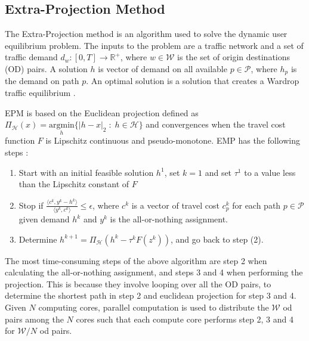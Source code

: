 \subsection{Extra-Projection Method}
The Extra-Projection method is an algorithm used to solve the dynamic user equilibrium problem. The inputs to the problem are a traffic network and a set of traffic demand $d_w : [0,T]\rightarrow \mathbb{R}^+ $, where $w\in\mathcal{W}$ is the set of origin destinations (OD) pairs. A solution $h$ is vector of demand on all available $ p\in\mathcal{P}$, where $h_p$ is the demand on path $p$. An optimal solution is a solution that creates a Wardrop traffic equilibrium \cite{wardrop1952some}. 

EPM is based on the Euclidean projection defined as $\Pi_\mathcal{H}(x) = \underset{h}{\text{argmin}}\{\lvert h-x\rvert_2 \; : \;h \in\mathcal{H} \}$ and convergences when the travel cost function $F$ is Lipschitz continuous and pseudo-monotone. EMP has the following steps \cite{nie2010solving}:
\begin{enumerate}
    \item Start with an initial feasible solution $h^{1}$, set $k=1$ and set $\tau^1$ to a value less than the Lipschitz constant of $F$
    \item Stop if $\frac {\langle c^k,y^k-h^k \rangle}{\langle y^k, c^k\rangle} \leq \epsilon$, where $c^k$ is a vector of travel cost $c_p^k$ for each path  $ p\in\mathcal{P}$ given demand $h^k$ and $y^k$ is the all-or-nothing assignment.
    \item Determine $h^{k+1} = \Pi_\mathcal{H}(h^k - \tau^k F(z^k))$, and go back to step (2).
\end{enumerate}

The most time-consuming steps of the above algorithm are step 2 when calculating the all-or-nothing assignment, and steps 3 and 4 when performing the projection. This is because they involve looping over all the OD pairs, to determine the shortest path in step 2 and euclidean projection for step 3 and 4. Given $N$ computing cores, parallel computation is used to distribute the $\mathcal{W}$ od pairs among the $N$ cores such that each compute core performs step 2, 3 and 4 for $\mathcal{W}/N$ od pairs. 
